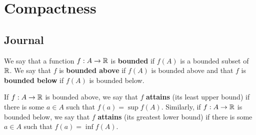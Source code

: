 \documentclass[../main.tex]{subfiles}
\begin{document}
\chapter{Compactness}\label{sct:10}
\section{Journal}
\begin{definition}\label{dfn:10.1}
    We say that a function $f:A\to\mathbb{R}$ is \textbf{bounded} if $f(A)$ is a bounded subset of $\mathbb{R}$. We say that $f$ is \textbf{bounded above} if $f(A)$ is bounded above and that $f$ is \textbf{bounded below} if $f(A)$ is bounded below.\par
    If $f:A\to\mathbb{R}$ is bounded above, we say that $f$ \textbf{attains} (its least upper bound) if there is some $a\in A$ such that $f(a)=\sup f(A)$. Similarly, if $f:A\to\mathbb{R}$ is bounded below, we say that $f$ \textbf{attains} (its greatest lower bound) if there is some $a\in A$ such that $f(a)=\inf f(A)$.
\end{definition}
\end{document}
